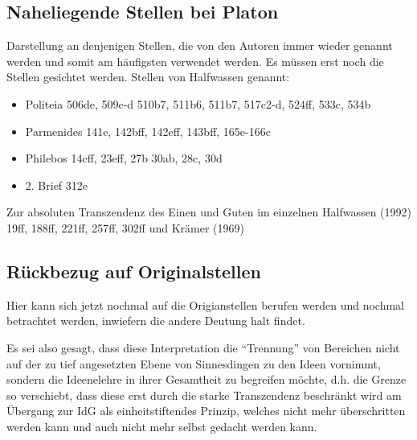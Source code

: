 \subsection*{Naheliegende Stellen bei Platon %
}
Darstellung an denjenigen Stellen, die von den Autoren immer wieder genannt werden und somit am häufigsten verwendet werden. Es müssen erst noch die Stellen gesichtet werden. Stellen von Halfwassen genannt:
\begin{itemize}
    \item {Politeia 506de, 509c-d 510b7, 511b6, 511b7, 517c2-d, 524ff, 533c, 534b}
    \item {Parmenides 141e, 142bff, 142eff, 143bff, 165e-166c}
    \item {Philebos 14cff, 23eff, 27b 30ab, 28c, 30d}
    \item {2. Brief 312e}
\end{itemize}

Zur absoluten Transzendenz des Einen und Guten im einzelnen Halfwassen (1992) 19ff, 188ff, 221ff, 257ff, 302ff und Krämer (1969)
\subsection{Rückbezug auf Originalstellen}
Hier kann sich jetzt nochmal auf die Origianstellen berufen werden und nochmal betrachtet werden, inwiefern die andere Deutung halt findet.


Es sei also gesagt, dass diese Interpretation die \enquote{Trennung} von Bereichen nicht auf der zu tief angesetzten Ebene von Sinnesdingen zu den Ideen vornimmt, sondern die Ideenelehre in ihrer Gesamtheit zu begreifen möchte, d.h. die Grenze so verschiebt, dass diese erst durch die starke Transzendenz beschränkt wird am Übergang zur IdG als einheitstiftendes Prinzip, welches nicht mehr überschritten werden kann und auch nicht mehr selbst gedacht werden kann.

